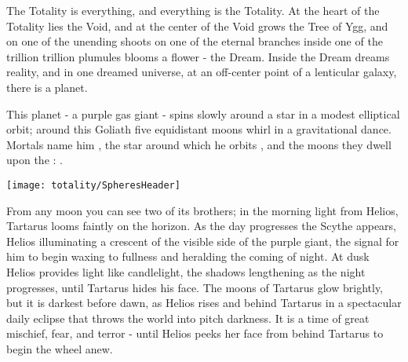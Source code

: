 


    The Totality is everything, and everything is the Totality. At the heart of the Totality lies the Void, and at the center of the Void grows the Tree of Ygg, and on one of the unending shoots on one of the eternal branches inside one of the trillion trillion plumules blooms a flower - the Dream. Inside the Dream \TheAuthority dreams reality, and in one dreamed universe, at an off-center point of a lenticular galaxy, there is a planet.

    This planet - a purple gas giant - spins slowly around a star in a modest elliptical orbit; around this Goliath five equidistant moons whirl in a gravitational dance.  Mortals name him , the star around which he orbits , and the moons they dwell upon the :  .

\texttt{[image: totality/SpheresHeader]}

    From any moon you can see two of its brothers; in the morning light from Helios, Tartarus looms faintly on the horizon. As the day progresses the Scythe appears, Helios illuminating a crescent of the visible side of the purple giant, the signal for him to begin waxing to fullness and heralding the coming of night. At dusk Helios provides light like candlelight, the shadows lengthening as the night progresses, until Tartarus hides his face. The moons of Tartarus glow brightly, but it is darkest before dawn, as Helios rises and behind Tartarus in a spectacular daily eclipse that throws the world into pitch darkness. It is a time of great mischief, fear, and terror - until Helios peeks her face from behind Tartarus to begin the wheel anew.


